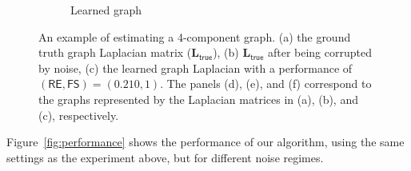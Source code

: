 \begin{figure}[!htb]
\begin{subfigure}[b]{0.3\textwidth}
            \caption{Learned graph}
    \end{subfigure}
        \caption{An example of estimating a 4-component graph. (a) the ground truth graph Laplacian matrix ($\mathbf{L}_{\mathsf{true}}$),
                 (b) $\mathbf{L}_{\mathsf{true}}$ after being corrupted by noise, (c) the learned graph Laplacian with a performance of
                 $(\mathsf{RE}, \mathsf{FS}) = (0.210, 1)$.
                 The panels (d), (e), and (f) correspond to the graphs represented by the Laplacian matrices in
                 (a), (b), and (c), respectively.}\label{fig:4-comp-graph}
        \label{fig:4-comp}
\end{figure}

Figure~\ref{fig:performance} shows the performance of our algorithm, using the same settings as the experiment above,
but for different noise regimes.
